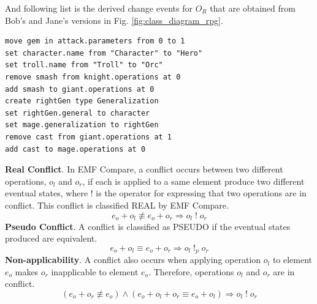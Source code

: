 And following list is the derived change events for $O_{R}$ that are obtained from Bob's and Jane's versions in Fig. \ref{fig:class_diagram_rpg}. 
\begin{lstlisting}[firstnumber=1,style=eol,caption={The derived change events (operations) made by Alice to produce the right model in Fig. \ref{fig:class_diagram_right} (right version).},label=lst:cbp_right_state]
move gem in attack.parameters from 0 to 1
set character.name from "Character" to "Hero"
set troll.name from "Troll" to "Orc"
remove smash from knight.operations at 0
add smash to giant.operations at 0
create rightGen type Generalization
set rightGen.general to character
set mage.generalization to rightGen
remove cast from giant.operations at 1
add cast to mage.operations at 0
\end{lstlisting}

\textbf{Real Conflict}. In EMF Compare, a conflict occurs between two different operations, $o_{l}$ and $o_{r}$, if each is applied to a same element produce two different eventual states, where $!$ is the operator for expressing that two operations are in conflict. This conflict is classified \textsf{REAL} by EMF Compare.
\begin{equation} \label{eq:conflict_1.8}
e_{o} + o_{l} \not\equiv e_{o} + o_{r} \Rightarrow o_{l}\;!\;o_{r}
\end{equation} 
\textbf{Pseudo Conflict}. A conflict is classified as \textsf{PSEUDO} if the eventual states produced are equivalent. 
\begin{equation} \label{eq:conflict_1.9}
e_{o} + o_{l} \equiv e_{o} + o_{r} \Rightarrow o_{l}\;!_{p}\;o_{r}
\end{equation} 
\textbf{Non-applicability}. A conflict also occurs when applying operation $o_{l}$ to element $e_{o}$ makes $o_{r}$ inapplicable to element $e_{o}$. Therefore, operations $o_{l}$ and $o_{r}$ are in conflict. 
\begin{equation} \label{eq:conflict_1.10}
(e_{o} + o_{r} \not\equiv e_{o}) \wedge (e_{o} + o_{l} + o_{r} \equiv e_{o} + o_{l}) \Rightarrow o_{l}\;!\;o_{r}
\end{equation}


